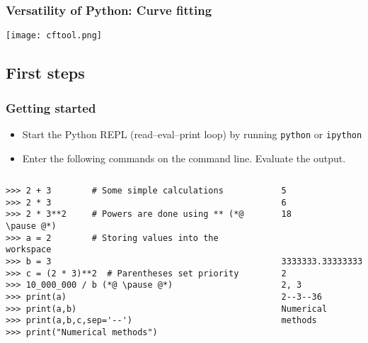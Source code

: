 
{\nologo
\begin{frame}
  \frametitle{Versatility of Python: Curve fitting}
  \centering\texttt{[image: cftool.png]}
\end{frame}
}

\subsection{First steps}
\begin{frame}[fragile]
  \frametitle{Getting started}
  \begin{itemize}
    \item Start the Python REPL (read–eval–print loop) by running \lstinline|python| or \lstinline|ipython|
    \item Enter the following commands on the command line. Evaluate the output.
  \end{itemize}
  \pause
  \begin{columns}
      \begin{lstlisting}[numbers=none]
>>> 2 + 3        # Some simple calculations
>>> 2 * 3
>>> 2 * 3**2     # Powers are done using ** (*@ \pause @*)
>>> a = 2        # Storing values into the workspace
>>> b = 3
>>> c = (2 * 3)**2  # Parentheses set priority
>>> 10_000_000 / b (*@ \pause @*)
>>> print(a)
>>> print(a,b)
>>> print(a,b,c,sep='--')
>>> print("Numerical methods")
      \end{lstlisting}\pause
      \begin{lstlisting}[style=PyOutput,numbers=none]
5
6
18



3333333.3333333335
2
2, 3
2--3--36
Numerical methods
      \end{lstlisting}
  \end{columns}
\end{frame}

